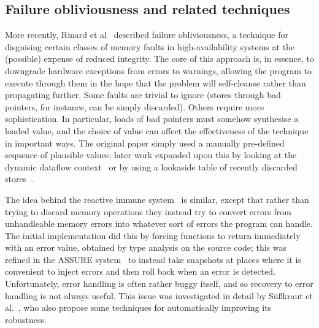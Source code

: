 \subsection{Failure obliviousness and related techniques}
More recently, Rinard et al~\cite{FFFRinard2004} described failure
obliviousness, a technique for disguising certain classes of memory
faults in high-availability systems at the (possible) expense of
reduced integrity.  The core of this approach is, in essence, to
downgrade hardware exceptions from errors to warnings, allowing the
program to execute through them in the hope that the problem will
self-cleanse rather than propagating further.  Some faults are trivial
to ignore (stores through bad pointers, for instance, can be simply
discarded).  Others require more sophistication.  In particular, loads
of bad pointers must somehow synthesise a loaded value, and the choice
of value can affect the effectiveness of the technique in important
ways.  The original paper simply used a manually pre-defined sequence
of plausible values; later work expanded upon this by looking at the
dynamic dataflow context~\cite{Nagarajan2009} or by using a lookaside
table of recently discarded stores~\cite{Rinard2005a}.

The idea behind the reactive immune system~\cite{Sidiroglou2005} is
similar, except that rather than trying to discard memory operations
they instead try to convert errors from unhandleable memory errors
into whatever sort of errors the program can handle.  The initial
implementation did this by forcing functions to return immediately
with an error value, obtained by type analysis on the source code;
this was refined in the ASSURE system~\cite{Sidiroglou2009} to instead
take snapshots at places where it is convenient to inject errors and
then roll back when an error is detected.  Unfortunately, error
handling is often rather buggy itself, and so recovery to error
handling is not always useful.  This issue was investigated in detail
by S\"{u}\ss{}kraut et al.~\cite{FFFSusskraut2006}, who also propose
some techniques for automatically improving its robustness.

